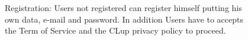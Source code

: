 \begin{figure}[H]
  \caption{Registration: Users not registered can register himself putting his own data, e-mail and password. In addition Users have to accepts the Term of Service and the CLup privacy policy to proceed.}
\end{figure}
